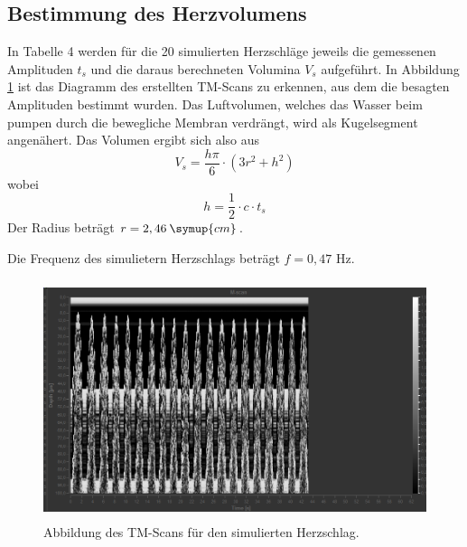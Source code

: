 \subsection{Bestimmung des Herzvolumens}
In Tabelle 4 werden für die 20 simulierten Herzschläge jeweils die gemessenen Amplituden $t_s$ und die daraus berechneten
Volumina $V_s$ aufgeführt. In Abbildung \ref{fig:TM} ist das Diagramm des erstellten TM-Scans zu erkennen, aus dem die besagten Amplituden
bestimmt wurden. Das Luftvolumen, welches das Wasser beim pumpen durch die bewegliche Membran verdrängt, wird als
Kugelsegment angenähert. Das Volumen ergibt sich also aus
\begin{equation*}
  V_s = \frac{h\pi}{6}\cdot(3r^2 + h^2)
\end{equation*}
wobei
\begin{equation*}
  h = \frac{1}{2}\cdot c \cdot t_s
\end{equation*}
Der Radius beträgt $r = 2,46 \: \symup{cm}$.

Die Frequenz des simulietern Herzschlags beträgt $f = 0,47$ Hz.

\begin{figure}[H]
  \centering
  \includegraphics[height=7cm]{TM-Scan.PNG}
  \caption{Abbildung des TM-Scans für den simulierten Herzschlag.}
  \label{fig:TM}
\end{figure}

